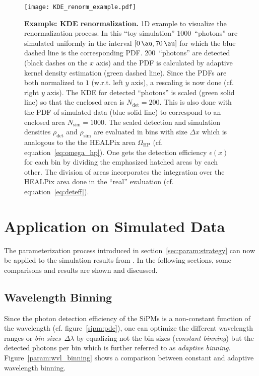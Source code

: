 \begin{figure}[H]
	\centering
	\texttt{[image: KDE\_renorm\_example.pdf]}
	\caption[Example: KDE renormalization]{\textbf{Example: KDE renormalization.} 1D example to visualize the renormalization process. In this \enquote{toy simulation} \num{1000}~\enquote{photons} are simulated uniformly in the interval $[\SI{0}{\au},\SI{70}{\au}]$ for which the blue dashed line is the corresponding PDF. \num{200}~\enquote{photons} are detected (black dashes on the $x$ axis) and the PDF is calculated by adaptive kernel density estimation (green dashed line). Since the PDFs are both normalized to $1$ (w.r.t. left $y$ axis), a rescaling is now done (cf. right $y$ axis). The KDE for detected \enquote{photons} is scaled (green solid line) so that the enclosed area is $N_\text{det}=\num{200}$. This is also done with the PDF of simulated data (blue solid line) to correspond to an enclosed area $N_\text{sim}=\num{1000}$. The scaled detection and simulation densities $\rho_\text{det}$ and $\rho_\text{sim}$ are evaluated in bins with size $\Delta x$ which is analogous to the the HEALPix area $\Omega_\text{HP}$ (cf. equation~\eqref{eq:omega_hp}). One gets the detection efficiency $\epsilon(x)$ for each bin by dividing the emphasized hatched areas by each other. The division of areas incorporates the integration over the HEALPix area done in the \enquote{real} evaluation (cf. equation~\eqref{eq:deteff}).}
	\label{deteff:1d_example}	
\end{figure}

\section{Application on Simulated Data}

The parameterization process introduced in section~\ref{sec:param:strategy} can now be applied to the simulation results from \geant. In the following sections, some comparisons and results are shown and discussed.

\subsection{Wavelength Binning}

Since the photon detection efficiency of the SiPMs is a non-constant function of the wavelength (cf. figure~\ref{sipm:pde}), one can optimize the different wavelength ranges or \textit{bin sizes}~$\Delta\lambda$ by equalizing not the bin sizes (\textit{constant binning}) but the detected photons per bin which is further referred to as \textit{adaptive binning}. Figure~\ref{param:wvl_binning} shows a comparison between constant and adaptive wavelength binning.

